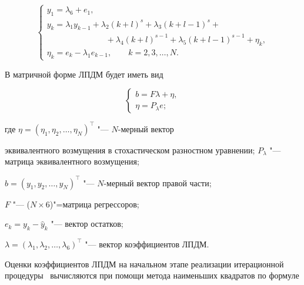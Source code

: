  \begin{equation}\label{a:eq15}

 \left\{\begin{array}{l}

 y_1=\lambda_6 +e_1,\\

  y_k=\lambda_1{y_{k-1}}+\lambda_2 (k+l)^s +\lambda_3(k+l-1)^s +

\\  

\hspace{3cm}  +

  \lambda_4 (k+l)^{s-1} + \lambda_5(k+l-1)^{s-1} +\eta_k , \\

 \eta_k=e_k-\lambda_1{e_{k-1}} , \qquad  k=2, 3, \dots, N .   \end{array}\right.

\end{equation}

В матричной форме ЛПДМ будет иметь вид

     \begin{equation}   \label{a:eq16}

     \left\{\begin{array}{l}

b=F\lambda+\eta,\\

\eta=P_{\lambda} e;

\end{array}\right.

        \end{equation}

где $\eta=(\eta_1,\eta_2,\dots ,\eta_N)^{\top}$ "--- $N$-мерный вектор

эквивалентного воз\-му\-ще\-ния \linebreak в сто\-ха\-сти\-чес\-ком раз\-ност\-ном уравнении; $P_{\lambda}$ "--- матрица эквивалентного возмущения; 

$b=(y_1,y_2,\ldots,y_N)^{\top}$ "--- $N$-мерный вектор правой части; 

$F$ "---  ($N{\times}6$)"=матрица регрессоров; 

$e_k=y_k-{\hat{y}}_k$ "--- вектор остатков;

$\lambda=(\lambda_1,\lambda_2,\ldots,\lambda_6)^{\top}$ "--- вектор коэффициентов ЛПДМ.



Оценки коэффициентов ЛПДМ на начальном этапе реализации итерационной процедуры~\cite{a:Nsk} вычисляются при помощи метода наименьших квадратов по формуле

